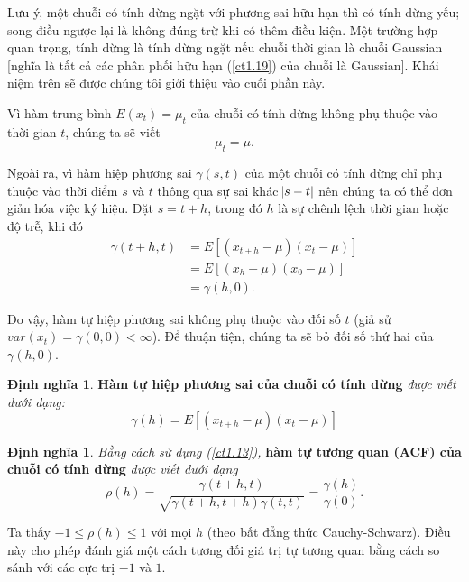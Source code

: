 \documentclass[12pt, a4paper,oneside]{book}
\theoremstyle{definition}
\newtheorem{dn}[theo]{Định nghĩa}
\begin{document}
Lưu ý, một chuỗi có tính dừng ngặt với phương sai hữu hạn thì có tính dừng yếu; song điều ngược lại là không đúng trừ khi có thêm điều kiện. Một trường hợp quan trọng, tính dừng là tính dừng ngặt nếu chuỗi thời gian là chuỗi Gaussian [nghĩa là tất cả các phân phối hữu hạn (\ref{ct1.19}) của chuỗi là Gaussian]. Khái niệm trên sẽ được chúng tôi giới thiệu vào cuối phần này.

Vì hàm trung bình $E(x_{t})=\mu_{t}$ của chuỗi có tính dừng không phụ thuộc vào thời gian $t$, chúng ta sẽ viết
\begin{equation}
\mu_{t}=\mu. \label{ct1.23}
\end{equation}

Ngoài ra, vì hàm hiệp phương sai  $\gamma(s, t)$ của một chuỗi có tính dừng chỉ phụ thuộc vào thời điểm $s$ và $t$ thông qua sự sai khác $ \abs{s-t} $ nên chúng ta có thể đơn giản hóa việc ký hiệu. Đặt $s = t + h$, trong đó $h$ là sự chênh lệch thời gian hoặc độ trễ, khi đó
\begin{align*}
\gamma(t+h, t)&= E[(x_{t+h}-\mu)(x_{t}-\mu)]\\
&=E[(x_{h}-\mu)(x_{0}-\mu)]\\
&=\gamma(h,0).
\end{align*}

Do vậy, hàm tự hiệp phương sai không phụ thuộc vào đối số $t$ (giả sử $var(x_{t}) =\gamma(0,0) < \infty $). Để thuận tiện, chúng ta sẽ bỏ đối số thứ hai của $\gamma(h,0)$.

\begin{dn}\cite{1} \textbf{Hàm tự hiệp phương sai của chuỗi có tính dừng}\textit{ được viết dưới dạng: 
		\begin{equation}
		\gamma(h)= E[(x_{t+h}-\mu)(x_{t}-\mu)] \label{ct1.24}
		\end{equation}	}
\end{dn}
\begin{dn}\cite{1} \textit{Bằng cách sử dụng (\ref{ct1.13}),}  \textbf{hàm tự tương quan (ACF) của chuỗi có tính dừng} \textit{được viết dưới dạng
		\begin{equation}
		\rho(h)=\frac{\gamma(t+h,t)}{\sqrt{\gamma(t+h,t+h)\gamma(t,t)}}=\dfrac{\gamma(h)}{\gamma(0)}. \label{ct1.25}
		\end{equation}}
\end{dn}

Ta thấy $−1\leqslant \rho(h) \leqslant 1$ với mọi $h$ (theo bất đẳng thức Cauchy-Schwarz). Điều này cho phép đánh giá một cách tương đối giá trị tự tương quan bằng cách so sánh với các cực trị $−1$ và $1$.
\end{document}
